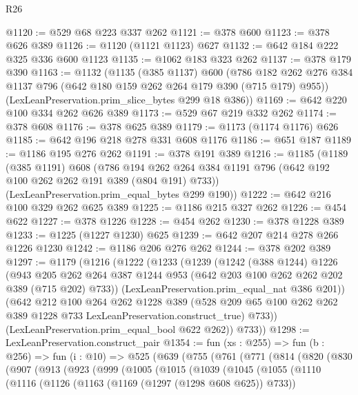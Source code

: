 \begin{lexlean}{R26}
\begin{coremodule}
{{{{{@1120 := @529 @68 @223 @337 @262
@1121 := @378 @600
@1123 := @378 @626 @389
@1126 := @1120 (@1121 @1123) @627
@1132 := @642 @184 @222 @325 @336 @600 @1123
@1135 := @1062 @183 @323 @262
@1137 := @378 @179 @390
@1163 := @1132
    (@1135
      (@385 @1137)
      @600
      (@786 @182 @262 @276 @384 @1137 @796 (@642 @180 @159 @262 @264 @179 @390 (@715 @179) @955))
      (LexLeanPreservation.prim_slice_bytes @299 @18 @386))
@1169 := @642 @220 @100 @334 @262 @626 @389
@1173 := @529 @67 @219 @332 @262
@1174 := @378 @608
@1176 := @378 @625 @389
@1179 := @1173 (@1174 @1176) @626
@1185 := @642 @196 @218 @278 @331 @608 @1176
@1186 := @651 @187
@1189 := @1186 @195 @276 @262
@1191 := @378 @191 @389
@1216 := @1185
    (@1189
      (@385 @1191)
      @608
      (@786 @194 @262 @264 @384 @1191 @796 (@642 @192 @100 @262 @262 @191 @389 (@804 @191) @733))
      (LexLeanPreservation.prim_equal_bytes @299 @190))
@1222 := @642 @216 @100 @329 @262 @625 @389
@1225 := @1186 @215 @327 @262
@1226 := @454 @622
@1227 := @378 @1226
@1228 := @454 @262
@1230 := @378 @1228 @389
@1233 := @1225 (@1227 @1230) @625
@1239 := @642 @207 @214 @278 @266 @1226 @1230
@1242 := @1186 @206 @276 @262
@1244 := @378 @202 @389
@1297 := @1179
    (@1216
      (@1222
        (@1233
          (@1239
            (@1242
              (@388 @1244)
              @1226
              (@943
                @205
                @262
                @264
                @387
                @1244
                @953
                (@642 @203 @100 @262 @262 @202 @389 (@715 @202) @733))
              (LexLeanPreservation.prim_equal_nat @386 @201))
            (@642
              @212
              @100
              @264
              @262
              @1228
              @389
              (@528 @209 @65 @100 @262 @262 @389 @1228 @733 LexLeanPreservation.construct_true)
              @733))
          (LexLeanPreservation.prim_equal_bool @622 @262))
        @733))
@1298 := LexLeanPreservation.construct_pair
@1354 := fun (xs : @255) =>
  fun (b : @256) =>
  fun (i : @10) =>
  @525
    (@639
      (@755
        (@761
          (@771
            (@814
              (@820
                (@830
                  (@907
                    (@913
                      (@923
                        (@999
                          (@1005
                            (@1015
                              (@1039
                                (@1045
                                  (@1055
                                    (@1110
                                      (@1116
                                        (@1126
                                          (@1163 (@1169 (@1297 (@1298 @608 @625)) @733))
}}}}}
\end{coremodule}
\end{lexlean}

